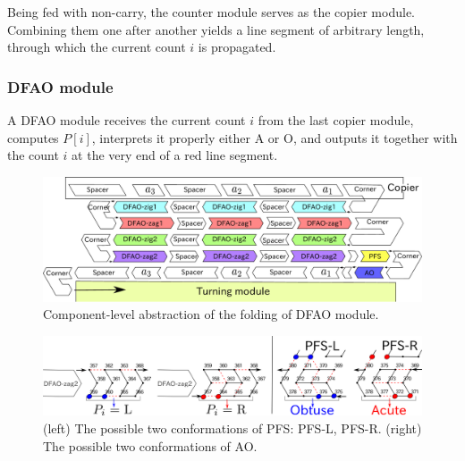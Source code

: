 Being fed with non-carry, the counter module serves as the copier module. 
Combining them one after another yields a line segment of arbitrary length, through which the current count $i$ is propagated. 


			\subsubsection{DFAO module}


A DFAO module receives the current count $i$ from the last copier module, computes $P[i]$, interprets it properly either A or O, and outputs it together with the count $i$ at the very end of a red line segment. 

\begin{figure}[h]
\includegraphics[width=\linewidth]{pic/abst_DFAO.pdf}
\caption{Component-level abstraction of the folding of DFAO module.}
\label{fig:abst_dfao}
\end{figure}


\begin{figure}[h]
\includegraphics[width=\linewidth]{pic/PFS.png}
\caption{(left) The possible two conformations of PFS: PFS-L, PFS-R. (right) The possible two conformations of AO.}
\label{fig:PFS}
\end{figure}


